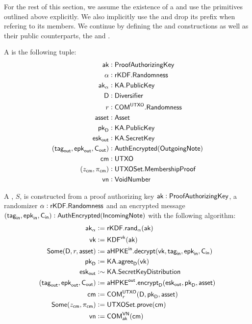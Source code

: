 For the rest of this section, we assume the existence of a \TransferConfiguration{} and use the primitives outlined above explicitly. We also implicitly use the \KeySchedule{} and drop its prefix when refering to its members. We continue by defining the \Sender{} and \Receiver{} constructions as well as their public counterparts, the \SenderPost{} and \ReceiverPost{}.

\begin{definition}
    A \Sender{} is the following tuple:
    \begin{align*}
        \ak                       &: \ProofAuthorizingKey \\
        \alpha                    &: \rKDF.\Randomness \\
        \ak_\alpha                &: \KA.\PublicKey \\
        \textsf{D}                &: \Diversifier \\
        r                         &: \COM^\UTXO.\Randomness \\
        \asset                    &: \Asset \\
        \pkD                      &: \KA.\PublicKey \\
        \eskout                   &: \KA.\SecretKey \\
        (\tagout, \epkout, \Cout) &: \AuthEncrypted(\OutgoingNote) \\
        \cm                       &: \UTXO \\
        (z_\cm, \pi_\cm)          &: \UTXOSet.\MembershipProof \\
        \vn                       &: \VoidNumber
    \end{align*}

    A \Sender{}, $S$, is constructed from a proof authorizing key $\ak : \ProofAuthorizingKey$, a randomizer $\alpha : \rKDF.\Randomness$ and an encrypted message $(\tagin, \epkin, \Cin) : \AuthEncrypted(\IncomingNote)$ with the following algorithm:
    \begin{align*}
        \ak_\alpha                   &:= \rKDF.\rand_\alpha(\ak) \\
        \vk                          &:= \KDF^\vk(\ak) \\
        \Some(\textsf{D}, r, \asset) &:= \aHPKEin.\decrypt(\vk, \tagin, \epkin, \Cin) \\
        \pkD                         &:= \KA.\agree_\textsf{D}(\vk) \\
        \eskout                      &:\sim \KA.\SecretKeyDistribution \\
        (\tagout, \epkout, \Cout)    &:= \aHPKEout.\encrypt_\textsf{D}(\eskout, \pkD, \asset) \\
        \cm                          &:= \COM^{\UTXO}_{r}(\textsf{D}, \pkD, \asset) \\
        \Some(z_\cm, \pi_\cm)        &:= \UTXOSet.\prove(\cm) \\
        \vn                          &:= \COM^{\VN}_\ak(\cm)
    \end{align*}
\end{definition}

